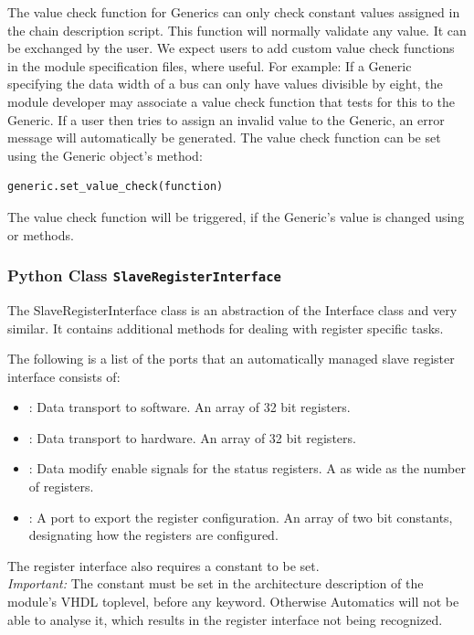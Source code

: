 The value check function for Generics can only check constant values assigned in the chain description script.
This function will normally validate any value. It can be exchanged by the user.
We expect users to add custom value check functions in the module specification files, where useful.
For example: If a Generic specifying the data width of a bus can only have values divisible by eight, the module developer may associate a value check function that tests for this to the Generic.
If a user then tries to assign an invalid value to the Generic, an error message will automatically be generated.
The value check function can be set using the Generic object's method:
\begin{lstlisting}[style=AutomaticsPython]
generic.set_value_check(function)
\end{lstlisting}

The value check function will be triggered, if the Generic's value is changed using  or  methods.

\subsubsection{Python Class \texttt{SlaveRegisterInterface}}

The SlaveRegisterInterface class is an abstraction of the Interface class and very similar.
It contains additional methods for dealing with register specific tasks.

The following is a list of the ports that an automatically managed slave register interface consists of:
\begin{itemize}
\item {}: Data transport to software. An array of 32 bit registers.
\item {}: Data transport to hardware. An array of 32 bit registers.
\item {}: Data modify enable signals for the status registers. A  as wide as the number of registers.
\item {}: A port to export the register configuration. An array of two bit  constants, designating how the registers are configured. 
\end{itemize}

The register interface also requires a constant to be set.\\
\emph{Important:} The constant  must be set in the architecture description of the module's VHDL toplevel, before any  keyword. Otherwise Automatics will not be able to analyse it, which results in the register interface not being recognized.

